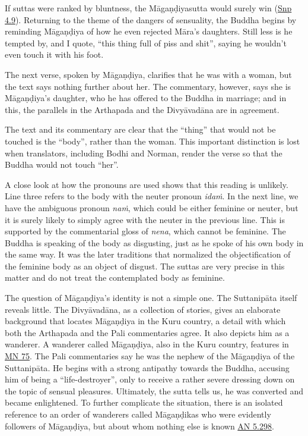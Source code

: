 \documentclass[12pt,openany]{book}%
\begin{document}
If suttas were ranked by bluntness, the \textsanskrit{Māgaṇḍiyasutta} would surely win (\href{https://suttacentral.net/snp4.9/en/sujato}{Snp 4.9}). Returning to the theme of the dangers of sensuality, the Buddha begins by reminding \textsanskrit{Māgaṇḍiya} of how he even rejected \textsanskrit{Māra}’s daughters. Still less is he tempted by, and I quote, “this thing full of piss and shit”, saying he wouldn’t even touch it with his foot.

The next verse, spoken by \textsanskrit{Māgaṇḍiya}, clarifies that he was with a woman, but the text says nothing further about her. The commentary, however, says she is \textsanskrit{Māgaṇḍiya}’s daughter, who he has offered to the Buddha in marriage; and in this, the parallels in the Arthapada and the \textsanskrit{Divyāvadāna} are in agreement.

The text and its commentary are clear that the “thing” that would not be touched is the “body”, rather than the woman. This important distinction is lost when translators, including Bodhi and Norman, render the verse so that the Buddha would not touch “her”.

A close look at how the pronouns are used shows that this reading is unlikely. Line three refers to the body with the neuter pronoun \textit{\textsanskrit{idaṁ}}. In the next line, we have the ambiguous pronoun \textit{\textsanskrit{naṁ}}, which could be either feminine or neuter, but it is surely likely to simply agree with the neuter in the previous line. This is supported by the commentarial gloss of \textit{nena}, which cannot be feminine. The Buddha is speaking of the body as disgusting, just as he spoke of his own body in the same way. It was the later traditions that normalized the objectification of the feminine body as an object of disgust. The suttas are very precise in this matter and do not treat the contemplated body as feminine.

The question of \textsanskrit{Māgaṇḍiya}’s identity is not a simple one. The \textsanskrit{Suttanipāta} itself reveals little. The \textsanskrit{Divyāvadāna}, as a collection of stories, gives an elaborate background that locates \textsanskrit{Māgaṇḍiya} in the Kuru country, a detail with which both the Arthapada and the Pali commentaries agree. It also depicts him as a wanderer. A wanderer called \textsanskrit{Māgaṇḍiya}, also in the Kuru country, features in \href{https://suttacentral.net/mn75/en/sujato}{MN 75}. The Pali commentaries say he was the nephew of the \textsanskrit{Māgaṇḍiya} of the \textsanskrit{Suttanipāta}. He begins with a strong antipathy towards the Buddha, accusing him of being a “life-destroyer”, only to receive a rather severe dressing down on the topic of sensual pleasures. Ultimately, the sutta tells us, he was converted and became enlightened. To further complicate the situation, there is an isolated reference to an order of wanderers called \textsanskrit{Māgaṇḍikas} who were evidently followers of \textsanskrit{Māgaṇḍiya}, but about whom nothing else is known \href{https://suttacentral.net/an5.298/en/sujato}{AN 5.298}.
\end{document}
